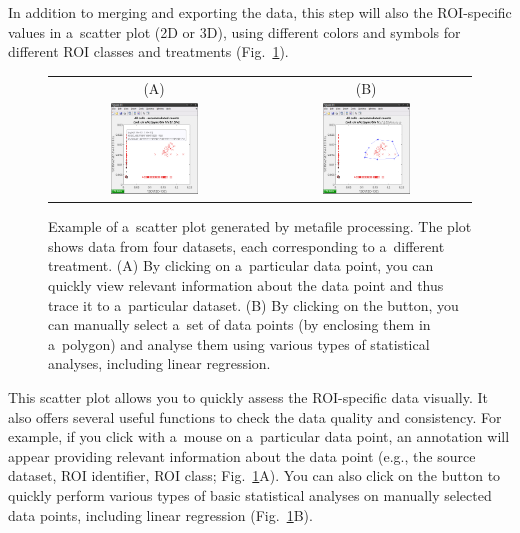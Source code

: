 \bul In addition to merging and exporting the data, this step will also  the ROI-specific values in a~scatter plot (2D or 3D), using different colors and symbols for different ROI classes and treatments (Fig.~\ref{fig:metafile-scatterplot}).

\begin{figure}[!b]
\centering
\begin{tabular}{cc}
(A) & (B) \\
\includegraphics[width=0.44\textwidth, valign=t]{figs3/LANS-metafile-scatterplot1}
&
\includegraphics[width=0.44\textwidth, valign=t]{figs3/LANS-metafile-scatterplot2}
\end{tabular}
\caption{\label{fig:metafile-scatterplot}%
Example of a~scatter plot generated by metafile processing.  The plot shows data from four datasets, each corresponding to a~different treatment. (A) By clicking on a~particular data point, you can quickly view relevant information about the data point and thus trace it to a~particular dataset. (B) By clicking on the  button, you can manually select a~set of data points (by enclosing them in a~polygon) and analyse them using various types of statistical analyses, including linear regression. }
\end{figure}

\bul This scatter plot allows you to quickly assess the ROI-specific data visually. It also offers several useful functions to check the data quality and consistency. For example, if you click with a~mouse on a~particular data point, an annotation will appear providing relevant information about the data point (e.g., the source dataset, ROI identifier, ROI class; Fig.~\ref{fig:metafile-scatterplot}A). You can also click on the  button to quickly perform various types of basic statistical analyses on manually selected data points, including linear regression (Fig.~\ref{fig:metafile-scatterplot}B).

